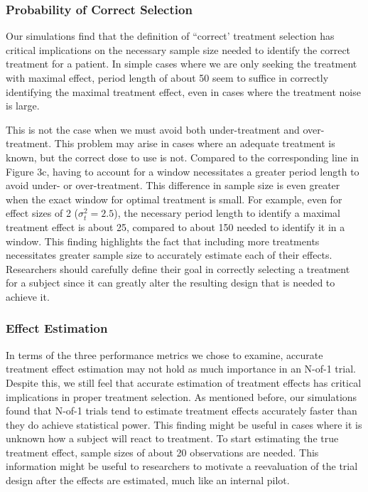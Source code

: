 \documentclass[11pt,]{article}
\begin{document}
\subsubsection{Probability of Correct
Selection}\label{probability-of-correct-selection}

Our simulations find that the definition of ``correct' treatment
selection has critical implications on the necessary sample size needed
to identify the correct treatment for a patient. In simple cases where
we are only seeking the treatment with maximal effect, period length of
about 50 seem to suffice in correctly identifying the maximal treatment
effect, even in cases where the treatment noise is large.

This is not the case when we must avoid both under-treatment and
over-treatment. This problem may arise in cases where an adequate
treatment is known, but the correct dose to use is not. Compared to the
corresponding line in Figure 3c, having to account for a window
necessitates a greater period length to avoid under- or over-treatment.
This difference in sample size is even greater when the exact window for
optimal treatment is small. For example, even for effect sizes of 2
(\(\sigma_t^2 = 2.5\)), the necessary period length to identify a
maximal treatment effect is about 25, compared to about 150 needed to
identify it in a window. This finding highlights the fact that including
more treatments necessitates greater sample size to accurately estimate
each of their effects. Researchers should carefully define their goal in
correctly selecting a treatment for a subject since it can greatly alter
the resulting design that is needed to achieve it.

\subsubsection{Effect Estimation}\label{effect-estimation}

In terms of the three performance metrics we chose to examine, accurate
treatment effect estimation may not hold as much importance in an N-of-1
trial. Despite this, we still feel that accurate estimation of treatment
effects has critical implications in proper treatment selection. As
mentioned before, our simulations found that N-of-1 trials tend to
estimate treatment effects accurately faster than they do achieve
statistical power. This finding might be useful in cases where it is
unknown how a subject will react to treatment. To start estimating the
true treatment effect, sample sizes of about 20 observations are needed.
This information might be useful to researchers to motivate a
reevaluation of the trial design after the effects are estimated, much
like an internal pilot.
\end{document}
